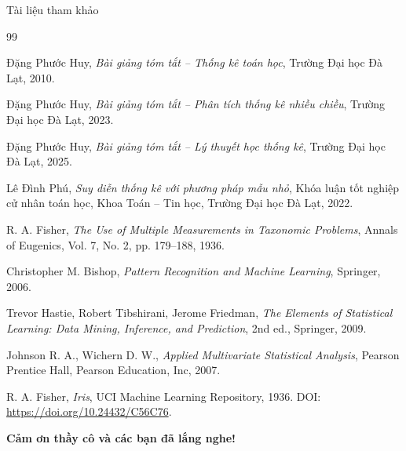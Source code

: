 \documentclass{beamer}
\begin{document}
\begin{frame}{Tài liệu tham khảo}
	\scriptsize
	
	\begin{thebibliography}{99}
		
		Đặng Phước Huy,
		\textit{Bài giảng tóm tắt -- Thống kê toán học},
		Trường Đại học Đà Lạt, 2010.
		
		Đặng Phước Huy,
		\textit{Bài giảng tóm tắt -- Phân tích thống kê nhiều chiều},
		Trường Đại học Đà Lạt, 2023.
		
		Đặng Phước Huy,
		\textit{Bài giảng tóm tắt -- Lý thuyết học thống kê},
		Trường Đại học Đà Lạt, 2025.
		
		Lê Đình Phú,
		\textit{Suy diễn thống kê với phương pháp mẫu nhỏ},
		Khóa luận tốt nghiệp cử nhân toán học,
		Khoa Toán -- Tin học, Trường Đại học Đà Lạt, 2022.
		
		R. A. Fisher,
		\textit{The Use of Multiple Measurements in Taxonomic Problems},
		Annals of Eugenics, Vol. 7, No. 2, pp. 179--188, 1936.
		
		Christopher M. Bishop,
		\textit{Pattern Recognition and Machine Learning},
		Springer, 2006.
		
		Trevor Hastie, Robert Tibshirani, Jerome Friedman,
		\textit{The Elements of Statistical Learning: Data Mining, Inference, and Prediction},
		2nd ed., Springer, 2009.
		
		Johnson R. A., Wichern D. W.,
		\textit{Applied Multivariate Statistical Analysis},
		Pearson Prentice Hall, Pearson Education, Inc, 2007.
		
		R. A. Fisher,
		\textit{Iris},
		UCI Machine Learning Repository, 1936.
		DOI: \url{https://doi.org/10.24432/C56C76}.
		
	\end{thebibliography}
	
\end{frame}
	
	\begin{frame}
		\centering
		\vspace{1.5cm}
		{\Large \textbf{Cảm ơn thầy cô và các bạn đã lắng nghe!}}
	\end{frame}
	
\end{document}

